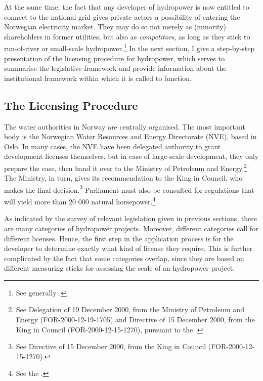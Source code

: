 At the same time, the fact that any developer of hydropower is now entitled to connect to the national grid gives private actors a possibility of entering the Norwegian electricity market. They may do so not merely as (minority) shareholders in former utilities, but also as {\it competitors}, as long as they stick to run-of-river or small-scale hydropower.\footnote{See generally \cite{larsen06,larsen08,larsen12}.} In the next section, I give a step-by-step presentation of the licensing procedure for hydropower, which serves to summarise the legislative framework and provide information about the institutional framework within which it is called to function.

\subsection{The Licensing Procedure}\label{sec:4:3:1}

The water authorities in Norway are centrally organised. The most important body is the Norwegian Water Resources and Energy Directorate (NVE), based in Oslo. In many cases, the NVE have been delegated authority to grant development licenses themselves, but in case of large-scale development, they only prepare the case, then hand it over to the Ministry of Petroleum and Energy.\footnote{See Delegation of 19 December 2000, from the Ministry of Petroleum and Energy (FOR-2000-12-19-1705) and Directive of 15 December 2000, from the King in Council (FOR-2000-12-15-1270), pursuant to the \dni\cite[64]{wra00}.} The Ministry, in turn, gives its recommendation to the King in Council, who makes the final decision.\footnote{See Directive of 15 December 2000, from the King in Council (FOR-2000-12-15-1270).} Parliament must also be consulted for regulations that will yield more than 20 000 natural horsepower.\footnote{See the \dni\cite[2]{wra17}.}

As indicated by the survey of relevant legislation given in previous sections, there are many categories of hydropower projects. Moreover, different categories call for different licenses. Hence, the first step in the application process is for the developer to determine exactly what kind of license they require. This is further complicated by the fact that some categories overlap, since they are based on different measuring sticks for assessing the scale of an hydropower project. 

